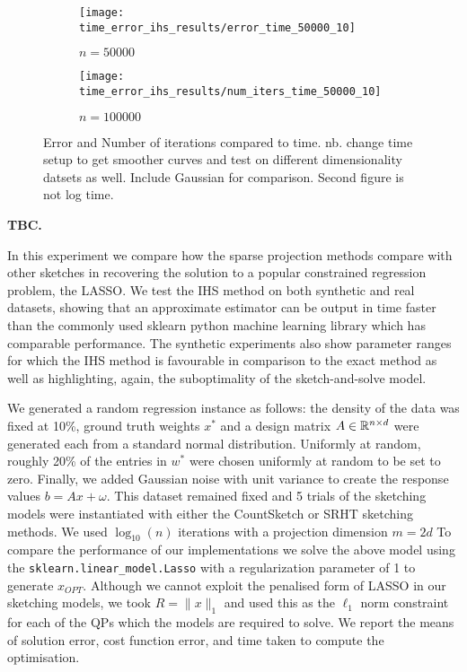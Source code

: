 \begin{figure}
    \centering
    \begin{subfigure}[b]{0.475\textwidth}
        \centering
        \texttt{[image: time\_error\_ihs\_results/error\_time\_50000\_10]}
        \caption{$n=50000$}
        \label{fig: ihs-lasso-error-time}
    \end{subfigure}
    \hfill
    \begin{subfigure}[b]{0.475\textwidth}
        \centering
        \texttt{[image: time\_error\_ihs\_results/num\_iters\_time\_50000\_10]}
        \caption{$n=100000$}
        \label{fig: ihs-lasso-iters-time}
    \end{subfigure}
    \caption{Error and Number of iterations compared to time.
              nb. change time setup to get smoother curves and test
              on different dimensionality datsets as well.
              Include Gaussian for comparison.
              Second figure is not log time.}
    \label{fig: ihs-lasso-time-comparison}
\end{figure}


\textbf{TBC.}

In this experiment we compare how the sparse projection methods compare with
other sketches in recovering the solution to a popular constrained regression
problem, the LASSO.
We test the IHS method on both synthetic and real datasets, showing that an approximate
estimator can be output in time faster than the commonly used sklearn
python machine learning library which has comparable performance.
The synthetic experiments also show parameter ranges for which the IHS method
is favourable in comparison to the exact method as well as highlighting, again,
the suboptimality of the sketch-and-solve model.

We generated a random regression instance as follows: the density of the data
was fixed at 10\%, ground truth weights $x^*$
and a design matrix $A \in \mathbb{R}^{n \times d}$ were generated each from a standard
normal distribution.
Uniformly at random, roughly 20\% of the entries in $w^*$ were chosen uniformly
at random to be set to zero.
Finally, we added Gaussian noise with unit variance to create the response values
$b = Ax + \omega$.
This dataset remained fixed and 5 trials of the sketching models were instantiated
with either the CountSketch or SRHT sketching methods.
We used $\log_{10}(n)$ iterations with a projection dimension $m = 2d$
To compare the performance of our implementations we solve the above model using
the \texttt{sklearn.linear\_model.Lasso} with a regularization parameter of 1 to
generate $x_{OPT}$.
Although we cannot exploit the penalised form of LASSO in our sketching models,
we took $R = \|x\|_1$ and used this as the $\ell_1$ norm constraint for each
of the QPs which the models are required to solve.
We report the means of solution error, cost function error, and time taken to
compute the optimisation.

